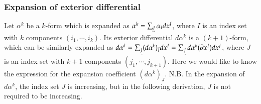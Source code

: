 \documentclass[11pt, a4paper]{book}
\begin{document}
\subsubsection{Expansion of exterior differential}

Let $\alpha^k$ be a $k$-form which is expanded as
$\alpha^k = \sum_{\underaccent{\rightharpoondown}{I}} \alpha_I dx^I$, where $I$ is an
index set with $k$ components $(i_1,\cdots,i_k)$. Its exterior differential $d\alpha^k$ is
a $(k+1)$-form, which can be similarly expanded as
$d\alpha^k = \sum_{\underaccent{\rightharpoondown}{J}} (d\alpha^k)_J dx^J =
\sum_{\underaccent{\rightharpoondown}{J}} d\alpha^k(\vect{\pdiff}x^J) dx^J$, where $J$ is
an index set with $k+1$ components $(j_1,\cdots,j_{k+1})$. Here we would like to know the
expression for the expansion coefficient $(d\alpha^k)_{J}$. N.B. In the expansion of
$d\alpha^k$, the index set $J$ is increasing, but in the following derivation, $J$ is not
required to be increasing.
\end{document}

